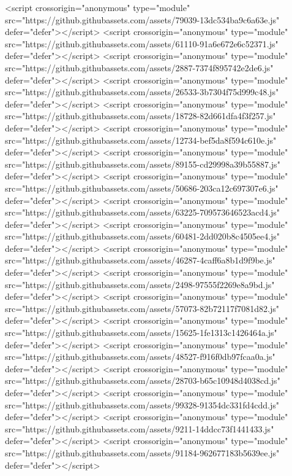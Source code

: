 <script crossorigin="anonymous" type="module" src="https://github.githubassets.com/assets/79039-13dc534ba9c6a63e.js" defer="defer"></script>
<script crossorigin="anonymous" type="module" src="https://github.githubassets.com/assets/61110-91a6e672e6c52371.js" defer="defer"></script>
<script crossorigin="anonymous" type="module" src="https://github.githubassets.com/assets/2887-7374f895742e2de6.js" defer="defer"></script>
<script crossorigin="anonymous" type="module" src="https://github.githubassets.com/assets/26533-3b7304f75d999c48.js" defer="defer"></script>
<script crossorigin="anonymous" type="module" src="https://github.githubassets.com/assets/18728-82d661dfa4f3f257.js" defer="defer"></script>
<script crossorigin="anonymous" type="module" src="https://github.githubassets.com/assets/12734-bef5da8f594c610e.js" defer="defer"></script>
<script crossorigin="anonymous" type="module" src="https://github.githubassets.com/assets/89155-cd29998a39b55887.js" defer="defer"></script>
<script crossorigin="anonymous" type="module" src="https://github.githubassets.com/assets/50686-203ca12c697307e6.js" defer="defer"></script>
<script crossorigin="anonymous" type="module" src="https://github.githubassets.com/assets/63225-709573646523acd4.js" defer="defer"></script>
<script crossorigin="anonymous" type="module" src="https://github.githubassets.com/assets/60481-2dd020b8c4505ee4.js" defer="defer"></script>
<script crossorigin="anonymous" type="module" src="https://github.githubassets.com/assets/46287-4caff6a8b1d9f9be.js" defer="defer"></script>
<script crossorigin="anonymous" type="module" src="https://github.githubassets.com/assets/2498-97555f2269e8a9bd.js" defer="defer"></script>
<script crossorigin="anonymous" type="module" src="https://github.githubassets.com/assets/57073-82b72117f7081d82.js" defer="defer"></script>
<script crossorigin="anonymous" type="module" src="https://github.githubassets.com/assets/15625-1fe1313c1426464a.js" defer="defer"></script>
<script crossorigin="anonymous" type="module" src="https://github.githubassets.com/assets/48527-f916f0db97fcaa0a.js" defer="defer"></script>
<script crossorigin="anonymous" type="module" src="https://github.githubassets.com/assets/28703-b65c10948d4038cd.js" defer="defer"></script>
<script crossorigin="anonymous" type="module" src="https://github.githubassets.com/assets/99328-91354dc331fd4cdd.js" defer="defer"></script>
<script crossorigin="anonymous" type="module" src="https://github.githubassets.com/assets/9211-14ddcc73f1441433.js" defer="defer"></script>
<script crossorigin="anonymous" type="module" src="https://github.githubassets.com/assets/91184-962677183b5639ee.js" defer="defer"></script>
